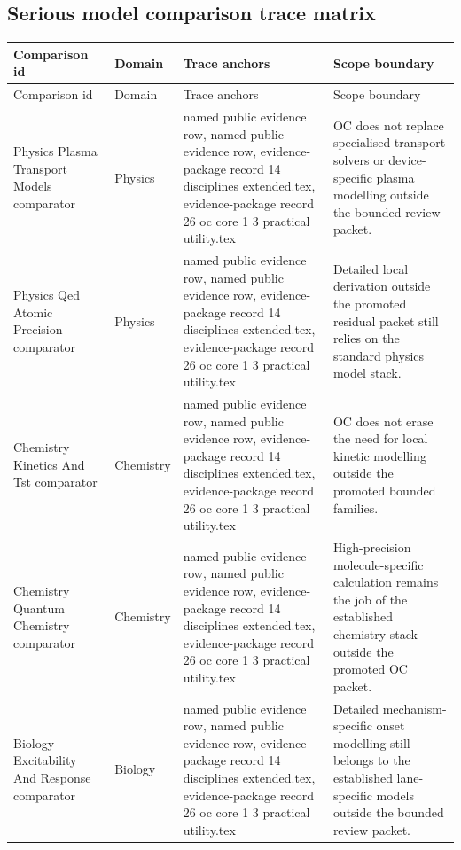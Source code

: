 \subsection{Serious model comparison trace matrix}
\begin{longtable}{@{}L{0.20\textwidth}L{0.11\textwidth}L{0.33\textwidth}L{0.28\textwidth}@{}}
\toprule
Comparison id & Domain & Trace anchors & Scope boundary \\
\midrule
\endfirsthead
\toprule
Comparison id & Domain & Trace anchors & Scope boundary \\
\midrule
\endhead
Physics Plasma Transport Models comparator & Physics & named public evidence row, named public evidence row, \allowbreak evidence-package record 14 disciplines extended.tex, \allowbreak evidence-package record 26 oc core 1 3 practical utility.tex & OC does not replace specialised transport solvers or device-specific plasma modelling outside the bounded review packet. \\
Physics Qed Atomic Precision comparator & Physics & named public evidence row, named public evidence row, \allowbreak evidence-package record 14 disciplines extended.tex, \allowbreak evidence-package record 26 oc core 1 3 practical utility.tex & Detailed local derivation outside the promoted residual packet still relies on the standard physics model stack. \\
Chemistry Kinetics And Tst comparator & Chemistry & named public evidence row, named public evidence row, \allowbreak evidence-package record 14 disciplines extended.tex, \allowbreak evidence-package record 26 oc core 1 3 practical utility.tex & OC does not erase the need for local kinetic modelling outside the promoted bounded families. \\
Chemistry Quantum Chemistry comparator & Chemistry & named public evidence row, named public evidence row, \allowbreak evidence-package record 14 disciplines extended.tex, \allowbreak evidence-package record 26 oc core 1 3 practical utility.tex & High-precision molecule-specific calculation remains the job of the established chemistry stack outside the promoted OC packet. \\
Biology Excitability And Response comparator & Biology & named public evidence row, named public evidence row, \allowbreak evidence-package record 14 disciplines extended.tex, \allowbreak evidence-package record 26 oc core 1 3 practical utility.tex & Detailed mechanism-specific onset modelling still belongs to the established lane-specific models outside the bounded review packet. \\

\end{longtable}
